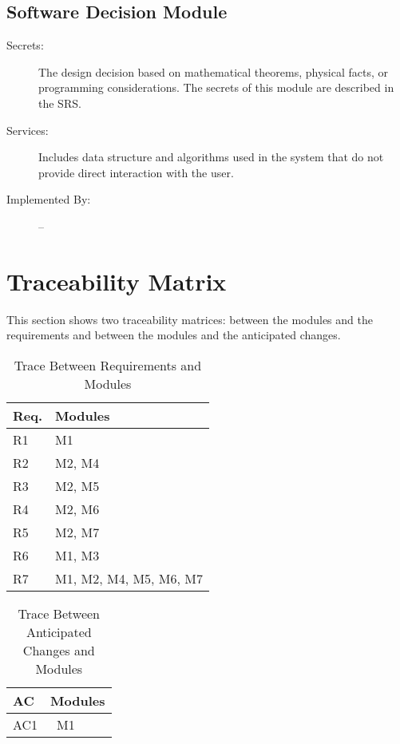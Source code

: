 \documentclass[12pt, titlepage]{article}
\newcommand{\rev}[1]{\textcolor{RevisionColour}{#1}}
\begin{document}
\subsection{Software Decision Module}
\begin{description}
\item[\rev{Secrets:}] \rev{The design decision based on mathematical theorems, physical facts, or programming considerations. The secrets of this module are described in the SRS.}
\item[\rev{Services:}] Includes data structure and algorithms used in the system that
  do not provide direct interaction with the user. 
\item[Implemented By:] --
\end{description}

\section{Traceability Matrix} \label{SecTM}

This section shows two traceability matrices: between the modules and the
requirements and between the modules and the anticipated changes.

\begin{table}[H]
\centering
\begin{tabular}{p{} p{}}
\toprule
\textbf{Req.} & \textbf{Modules}\\
\midrule
R1 & M1\\
R2 & M2, M4\\
R3 & M2, M5\\
R4 & M2, M6\\
R5 & M2, M7\\
R6 & M1, M3\\
R7 & M1, M2, M4, M5, M6, M7\\

\bottomrule
\end{tabular}
\caption{Trace Between Requirements and Modules}
\label{TblRT}
\end{table}

\begin{table}[H]
\centering
\begin{tabular}{p{} p{}}
\toprule
\textbf{AC} & \textbf{Modules}\\
\midrule
AC1 & \ M1\\
\bottomrule
\end{tabular}
\caption{Trace Between Anticipated Changes and Modules}
\label{TblACT}
\end{table}
\end{document}
